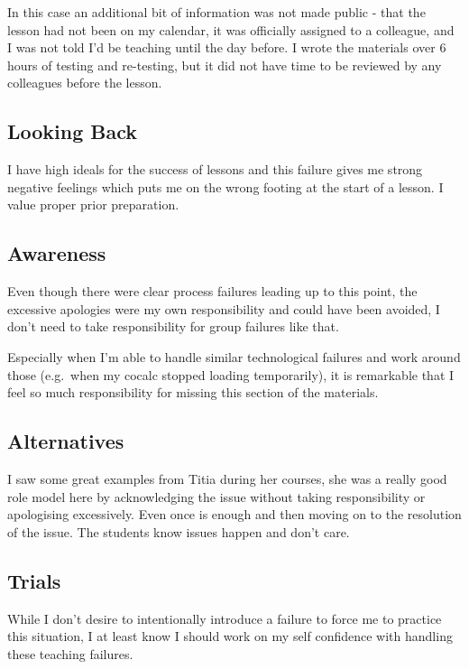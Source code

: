 \documentclass{tufte-handout}
\begin{document}
In this case an additional bit of information was not made public - that
the lesson had not been on my calendar, it was officially assigned to a
colleague, and I was not told I'd be teaching until the day before. I
wrote the materials over 6 hours of testing and re-testing, but it did
not have time to be reviewed by any colleagues before the lesson.

\hypertarget{looking-back-1}{%
\subsection{Looking Back}\label{looking-back-1}}

I have high ideals for the success of lessons and this failure gives me
strong negative feelings which puts me on the wrong footing at the start
of a lesson. I value proper prior preparation.

\hypertarget{awareness-1}{%
\subsection{Awareness}\label{awareness-1}}

Even though there were clear process failures leading up to this point,
the excessive apologies were my own responsibility and could have been
avoided, I don't need to take responsibility for group failures like
that.

Especially when I'm able to handle similar technological failures and
work around those (e.g.~when my cocalc stopped loading temporarily), it
is remarkable that I feel so much responsibility for missing this
section of the materials.

\hypertarget{alternatives-1}{%
\subsection{Alternatives}\label{alternatives-1}}

I saw some great examples from Titia during her courses, she was a
really good role model here by acknowledging the issue without taking
responsibility or apologising excessively. Even once is enough and then
moving on to the resolution of the issue. The students know issues
happen and don't care.

\hypertarget{trials-1}{%
\subsection{Trials}\label{trials-1}}

While I don't desire to intentionally introduce a failure to force me to
practice this situation, I at least know I should work on my self
confidence with handling these teaching failures.






\clearpage
{}



\end{document}
